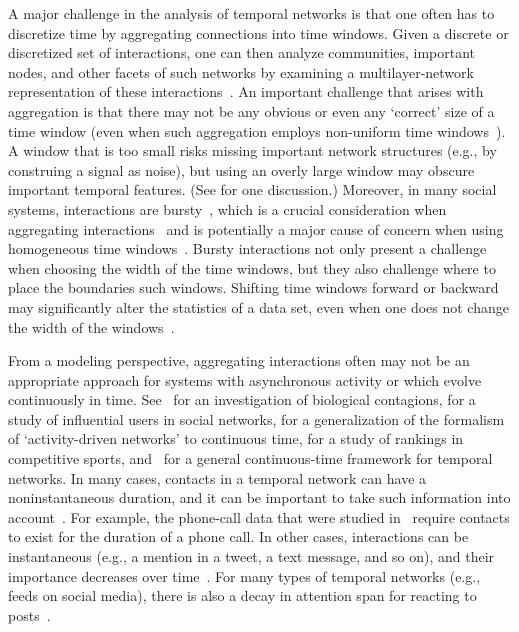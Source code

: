\documentclass[journal,transmag]{IEEEtran}
\begin{document}
A major challenge in the analysis of temporal networks is that one
often has to discretize time by aggregating connections into time
windows. Given a discrete or discretized set of interactions, one can
then analyze communities, important nodes, and other facets of such
networks by examining a multilayer-network representation of these
interactions~\cite{holme2015modern,kivela2014multilayer,Taylor2015,bazzi2016community}. 
An important challenge that arises with aggregation is that 
there may not be any obvious or even any `correct' size of a time window (even when such aggregation
employs non-uniform time
windows~\cite{Sulo2010,caceres2011,psorakis2012,psorakis2013probabilistic}).
A window that is too small risks missing important network structures 
(e.g., by construing a signal as noise), but using an overly
large window may obscure important temporal features.
(See \cite{fenn2012} for one discussion.)  Moreover, in many
social systems, interactions are
bursty~\cite{Beguerisse2010,holme2012temporal,kivela2015}, which is a
crucial consideration when aggregating
interactions~\cite{hoffmann2012generalized} and is potentially a major
cause of concern when using homogeneous time
windows~\cite{psorakis2012}. Bursty interactions not only present a
challenge when choosing the width of the time windows, but they also
challenge {where} to place the boundaries such windows. Shifting time windows
forward or backward may significantly alter the statistics of
a data set, even when one does not change the width of
the windows~\cite{kivela2015}.

From a modeling perspective, aggregating interactions often may not
be an appropriate approach for systems with asynchronous activity or
which evolve continuously in time. See~\cite{Valdano2018} for an
investigation of biological contagions, \cite{yang2018} for a study of
influential users in social networks, \cite{zino2016,zino2017} for a
generalization of the formalism of `activity-driven networks' to
continuous time, \cite{Motegi2012} for a study of rankings in
competitive sports, and~\cite{Flores2018} for a general
continuous-time framework for temporal networks. In many cases,
contacts in a temporal network can have a noninstantaneous duration, and it can be important
to take such information into account~\cite{Onnela2007,moro2015}. For
example, the phone-call data that were studied in~\cite{Grindrod2014}
require contacts to exist for the duration of a phone call. In other
cases, interactions can be instantaneous (e.g., a mention in a tweet,
a text message, and so on), and their importance decreases over
time~\cite{Burt2000,laub2015}. For many types of temporal networks
(e.g., feeds on social media), there is also a decay in attention span
for reacting to
posts~\cite{Hodas2012,lerman-digg2,lerman2016information}.
\end{document}
